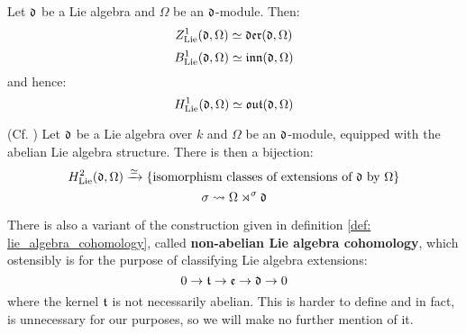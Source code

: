         \begin{theorem}
            \cite[Theorem 2.1 and Proposition 2.2]{hilton_stammbach_homological_algebra} Let $\mathfrak{d}$ be a Lie algebra and $\Omega$ be an $\mathfrak{d}$-module. Then:
                $$Z^1_{\mathrm{Lie}}(\mathfrak{d}, \Omega) \simeq \mathfrak{der}(\mathfrak{d}, \Omega)$$
                $$B^1_{\mathrm{Lie}}(\mathfrak{d}, \Omega) \simeq \mathfrak{inn}(\mathfrak{d}, \Omega)$$
            and hence:
                $$H^1_{\mathrm{Lie}}(\mathfrak{d}, \Omega) \simeq \mathfrak{out}(\mathfrak{d}, \Omega)$$
        \end{theorem}

        \begin{theorem} \label{theorem: H^2_of_lie_algebras_and_abelian_extensions}
            (Cf. \cite[Theorem VII.3.3]{hilton_stammbach_homological_algebra}) Let $\mathfrak{d}$ be a Lie algebra over $k$ and $\Omega$ be an $\mathfrak{d}$-module, equipped with the abelian Lie algebra structure. There is then a bijection:
                $$H^2_{\mathrm{Lie}}(\mathfrak{d}, \Omega) \xrightarrow[]{\simeq} \{ \text{isomorphism classes of extensions of $\mathfrak{d}$ by $\Omega$} \}$$
                $$\sigma \leadsto \Omega \rtimes^{\sigma} \mathfrak{d}$$
        \end{theorem}
        
        \begin{remark}
            There is also a variant of the construction given in definition \ref{def: lie_algebra_cohomology}, called \textbf{non-abelian Lie algebra cohomology}, which ostensibly is for the purpose of classifying Lie algebra extensions:
                $$0 \to \mathfrak{t} \to \mathfrak{e} \to \mathfrak{d} \to 0$$
            where the kernel $\mathfrak{t}$ is not necessarily abelian. This is harder to define and in fact, is unnecessary for our purposes, so we will make no further mention of it.
        \end{remark}